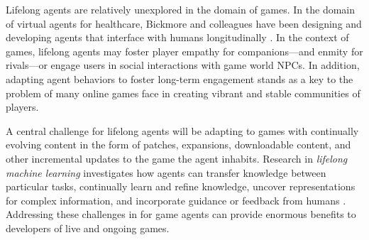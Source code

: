 \documentclass[conference]{IEEEtran}
\begin{document}
Lifelong agents are relatively unexplored in the domain of games.
In the domain of virtual agents for healthcare, Bickmore and colleagues have been designing and developing agents that interface with humans longitudinally \cite{bickmore2009:lifelong-agents}. 
In the context of games, lifelong agents may foster player empathy for companions---and enmity for rivals---or engage users in social interactions with game world NPCs. 
In addition, adapting agent behaviors to foster long-term engagement stands as a key to the problem of many online games face in creating vibrant and stable communities of players.



A central challenge for lifelong agents will be adapting to games with continually evolving content
in the form of  
patches, expansions, downloadable content, and other incremental updates to the game the agent inhabits.
Research in {\em lifelong machine learning} investigates how agents can transfer knowledge between particular tasks, continually learn and refine knowledge, uncover representations for complex information, and incorporate guidance or feedback from humans \cite{silver2013:lifelong-ml}.
Addressing these challenges in for game agents can provide enormous benefits to developers of live and ongoing games.
\end{document}
